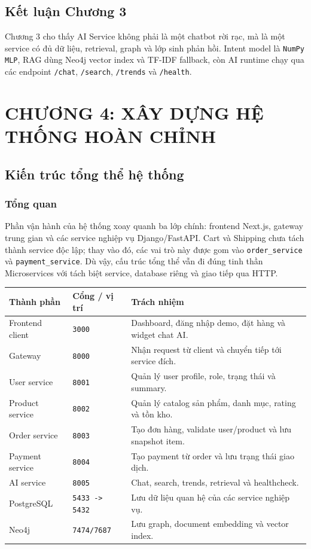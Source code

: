 \documentclass[12pt,a4paper]{article}
\begin{document}
\subsection{Kết luận Chương 3}
Chương 3 cho thấy AI Service không phải là một chatbot rời rạc, mà là một service có đủ dữ liệu, retrieval, graph và lớp sinh phản hồi. Intent model là \texttt{NumPy MLP}, RAG dùng Neo4j vector index và TF-IDF fallback, còn AI runtime chạy qua các endpoint \texttt{/chat}, \texttt{/search}, \texttt{/trends} và \texttt{/health}.

\section{CHƯƠNG 4: XÂY DỰNG HỆ THỐNG HOÀN CHỈNH}
\subsection{Kiến trúc tổng thể hệ thống}
\subsubsection{Tổng quan}
Phần vận hành của hệ thống xoay quanh ba lớp chính: frontend Next.js, gateway trung gian và các service nghiệp vụ Django/FastAPI. Cart và Shipping chưa tách thành service độc lập; thay vào đó, các vai trò này được gom vào \texttt{order\_service} và \texttt{payment\_service}. Dù vậy, cấu trúc tổng thể vẫn đi đúng tinh thần Microservices với tách biệt service, database riêng và giao tiếp qua HTTP.

\begin{longtable}{p{3.4cm}p{3.8cm}p{6.2cm}}
\toprule
\textbf{Thành phần} & \textbf{Cổng / vị trí} & \textbf{Trách nhiệm} \\
\midrule
Frontend client & \texttt{3000} & Dashboard, đăng nhập demo, đặt hàng và widget chat AI. \\
Gateway & \texttt{8000} & Nhận request từ client và chuyển tiếp tới service đích. \\
User service & \texttt{8001} & Quản lý user profile, role, trạng thái và summary. \\
Product service & \texttt{8002} & Quản lý catalog sản phẩm, danh mục, rating và tồn kho. \\
Order service & \texttt{8003} & Tạo đơn hàng, validate user/product và lưu snapshot item. \\
Payment service & \texttt{8004} & Tạo payment từ order và lưu trạng thái giao dịch. \\
AI service & \texttt{8005} & Chat, search, trends, retrieval và healthcheck. \\
PostgreSQL & \texttt{5433 -> 5432} & Lưu dữ liệu quan hệ của các service nghiệp vụ. \\
Neo4j & \texttt{7474/7687} & Lưu graph, document embedding và vector index. \\
\bottomrule
\end{longtable}
\end{document}
